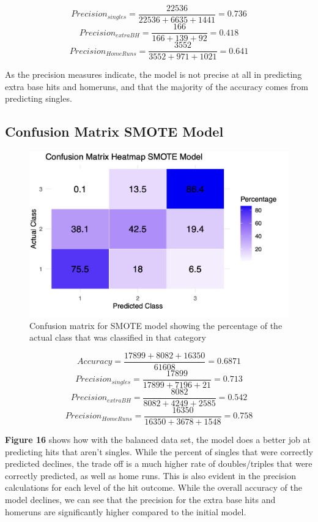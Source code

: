 \documentclass[
  letterpaper,
  DIV=11,
  numbers=noendperiod]{scrartcl}
\begin{document}
\[Precision_{singles} = \frac{22536}{22536 + 6635+ 1441} = 0.736\]
\[Precision_{extraBH} = \frac{166}{166 + 139 + 92} = 0.418\]
\[Precision_{HomeRuns} = \frac{3552}{3552 + 971 + 1021} = 0.641\]

As the precision measures indicate, the model is not precise at all in
predicting extra base hits and homeruns, and that the majority of the
accuracy comes from predicting singles.

\subsection{Confusion Matrix SMOTE
Model}\label{confusion-matrix-smote-model}

\begin{figure}[H]

{\centering \includegraphics{./images/figures/fig16.png}

}

\caption{Confusion matrix for SMOTE model showing the percentage of the
actual class that was classified in that category}

\end{figure}%

\[ Accuracy = \frac{17899 + 8082 + 16350}{61608} = 0.6871\]
\[Precision_{singles} = \frac{17899}{17899 + 7196 + 21} = 0.713\]
\[Precision_{extraBH} = \frac{8082}{8082 + 4249 + 2585} = 0.542\]
\[Precision_{HomeRuns} = \frac{16350}{16350 + 3678 + 1548} = 0.758\]

\textbf{Figure 16} shows how with the balanced data set, the model does
a better job at predicting hits that aren't singles. While the percent
of singles that were correctly predicted declines, the trade off is a
much higher rate of doubles/triples that were correctly predicted, as
well as home runs. This is also evident in the precision calculations
for each level of the hit outcome. While the overall accuracy of the
model declines, we can see that the precision for the extra base hits
and homeruns are significantly higher compared to the initial model.
\end{document}
